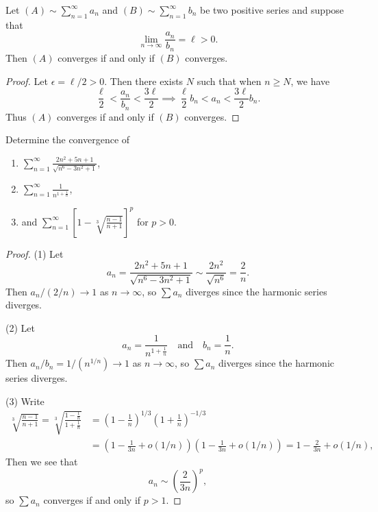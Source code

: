 \begin{theorem}
  Let $(A) \sim \sum_{n = 1}^\infty a_n$ and
  $(B) \sim \sum_{n = 1}^\infty b_n$ be two positive
  series and suppose that
  \[
    \lim_{n \to \infty} \frac{a_n}{b_n} = \ell > 0.
  \]
  Then $(A)$ converges if and only if $(B)$ converges.
\end{theorem}

\begin{proof}
  Let $\epsilon = \ell / 2 > 0$. Then there exists $N$
  such that when $n \ge N$, we have
  \[
    \frac{\ell}{2} < \frac{a_n}{b_n} < \frac{3\ell}{2}
    \implies \frac{\ell}{2} b_n < a_n < \frac{3\ell}{2} b_n.
  \]
  Thus $(A)$ converges if and only if $(B)$ converges.
\end{proof}

\begin{example}
  Determine the convergence of
  \begin{enumerate}
    \item $\displaystyle \sum_{n = 1}^\infty \frac{2n^2 + 5n + 1}{\sqrt{n^6 - 3n^2 + 1}}$,
    \item $\displaystyle \sum_{n = 1}^\infty \frac{1}{n^{1 + \frac{1}{n}}}$,
    \item and $\displaystyle \sum_{n = 1}^\infty \left[1 - \sqrt[3]{\frac{n - 1}{n + 1}}\right]^p$ for $p > 0$.
  \end{enumerate}
\end{example}

\begin{proof}
  (1) Let
  \[
    a_n = \frac{2n^2 + 5n + 1}{\sqrt{n^6 - 3n^2 + 1}}
    \sim \frac{2n^2}{\sqrt{n^6}} = \frac{2}{n}.
  \]
  Then $a_n / (2 / n) \to 1$ as $n \to \infty$, so
  $\sum a_n$ diverges since the harmonic series
  diverges.

  (2) Let
  \[
    a_n = \frac{1}{n^{1 + \frac{1}{n}}}
    \quad \text{and} \quad
    b_n = \frac{1}{n}.
  \]
  Then $a_n / b_n = 1 / (n^{1 / n}) \to 1$ as $n \to \infty$,
  so $\sum a_n$ diverges since the harmonic series
  diverges.

  (3) Write
  \begin{align*}
    \sqrt[3]{\frac{n - 1}{n + 1}}
    = \sqrt[3]{\frac{1 - \frac{1}{n}}{1 + \frac{1}{n}}}
    &= \left(1 - \frac{1}{n}\right)^{1 / 3} \left(1 + \frac{1}{n}\right)^{-1 / 3} \\
    &= \left(1 - \frac{1}{3n} + o(1 / n)\right) \left(1 - \frac{1}{3n} + o(1 / n)\right)
    = 1 - \frac{2}{3n} + o(1 / n),
  \end{align*}
  Then we see that
  \[
    a_n \sim \left(\frac{2}{3n}\right)^p,
  \]
  so $\sum a_n$ converges if and only if $p > 1$.
\end{proof}


